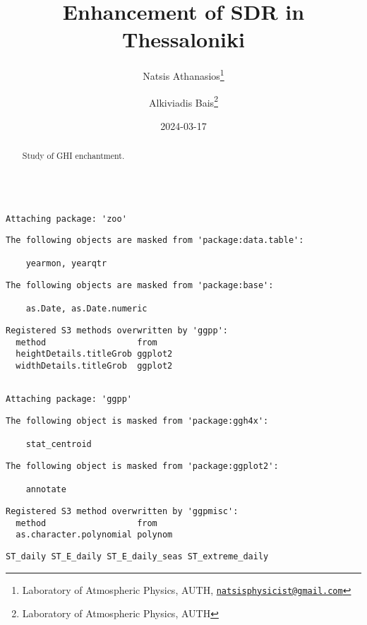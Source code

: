 \documentclass[
  10pt,
  a4paper,oneside]{article}
\title{Enhancement of SDR in Thessaloniki}
\author{Natsis Athanasios\footnote{Laboratory of Atmospheric Physics, AUTH, \href{mailto:natsisphysicist@gmail.com}{\nolinkurl{natsisphysicist@gmail.com}}} \and Alkiviadis Bais\footnote{Laboratory of Atmospheric Physics, AUTH}}
\date{2024-03-17}
\begin{document}
\maketitle
\begin{abstract}
Study of GHI enchantment.
\end{abstract}

{
\hypersetup{linkcolor=}
\setcounter{tocdepth}{4}
\tableofcontents
}
\begin{verbatim}

Attaching package: 'zoo'
\end{verbatim}

\begin{verbatim}
The following objects are masked from 'package:data.table':

    yearmon, yearqtr
\end{verbatim}

\begin{verbatim}
The following objects are masked from 'package:base':

    as.Date, as.Date.numeric
\end{verbatim}

\begin{verbatim}
Registered S3 methods overwritten by 'ggpp':
  method                  from   
  heightDetails.titleGrob ggplot2
  widthDetails.titleGrob  ggplot2
\end{verbatim}

\begin{verbatim}

Attaching package: 'ggpp'
\end{verbatim}

\begin{verbatim}
The following object is masked from 'package:ggh4x':

    stat_centroid
\end{verbatim}

\begin{verbatim}
The following object is masked from 'package:ggplot2':

    annotate
\end{verbatim}

\begin{verbatim}
Registered S3 method overwritten by 'ggpmisc':
  method                  from   
  as.character.polynomial polynom
\end{verbatim}

\begin{verbatim}
ST_daily ST_E_daily ST_E_daily_seas ST_extreme_daily
\end{verbatim}
\end{document}
